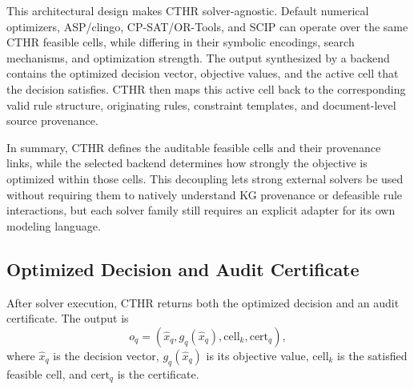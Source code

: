 ﻿\documentclass[a4paper,fleqn]{cas-dc}
\newcommand{\CTHR}{\textsc{CTHR}}
\begin{document}
This architectural design makes CTHR solver-agnostic. Default numerical
optimizers, ASP/clingo, CP-SAT/OR-Tools, and SCIP can operate over the same
\CTHR{} feasible cells, while differing in their symbolic encodings, search
mechanisms, and optimization strength. The output synthesized by a backend
contains the optimized decision vector, objective values, and the active cell
that the decision satisfies. CTHR then maps this active cell back to the
corresponding valid rule structure, originating rules, constraint templates,
and document-level source provenance.

In summary, CTHR defines the auditable feasible cells and their provenance
links, while the selected backend determines how strongly the objective is
optimized within those cells. This decoupling lets strong external solvers be
used without requiring them to natively understand KG provenance or defeasible
rule interactions, but each solver family still requires an explicit adapter
for its own modeling language.

\subsection{Optimized Decision and Audit Certificate}
\label{sec:optimized_decision_audit_certificate}

After solver execution, CTHR returns both the optimized decision and an audit certificate. The output is
\begin{equation}
o_q = (\hat{x}_q, g_q(\hat{x}_q), \mathrm{cell}_k, \mathrm{cert}_q),
\end{equation}
where $\hat{x}_q$ is the decision vector, $g_q(\hat{x}_q)$ is its objective value, $\mathrm{cell}_k$ is the satisfied feasible cell, and $\mathrm{cert}_q$ is the certificate.
\end{document}
